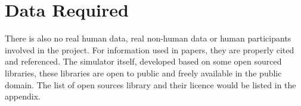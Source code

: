 \section{Data Required}
There is also no real human data, real non-human data or human participants involved in the project.
For information used in papers, they are properly cited and referenced.
The simulator itself, developed based on some open sourced libraries, these
libraries are open to public and freely available in the public domain.
The list of open sources library and their licence would be listed in the appendix.
